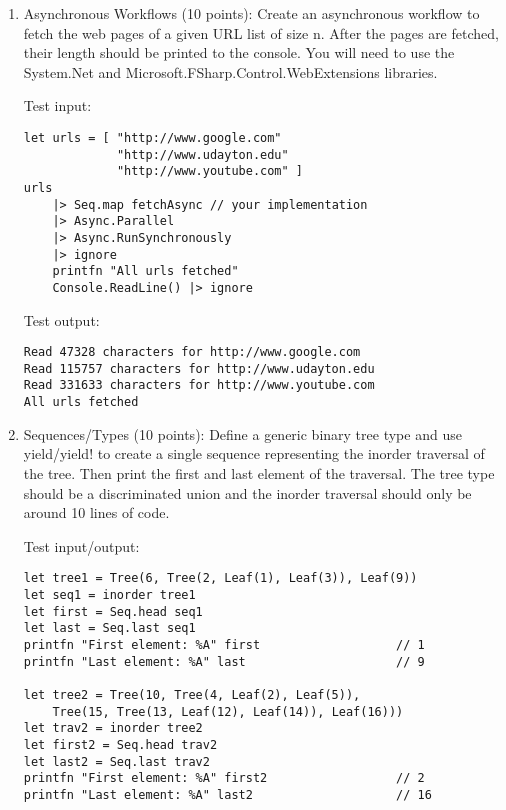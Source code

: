 \documentclass{article}
\begin{document}
\begin{enumerate}



\item
Asynchronous Workflows (10 points): Create an asynchronous workflow to fetch the web pages of a given URL list of size n. After the pages are fetched, their length should be printed to the console. You will need to use the System.Net and Microsoft.FSharp.Control.WebExtensions libraries.

\noindent
Test input:

\begin{lstlisting}
let urls = [ "http://www.google.com"
             "http://www.udayton.edu"
             "http://www.youtube.com" ]
urls
    |> Seq.map fetchAsync // your implementation
    |> Async.Parallel
    |> Async.RunSynchronously
    |> ignore
    printfn "All urls fetched"
    Console.ReadLine() |> ignore
\end{lstlisting}

\noindent
Test output:

\begin{lstlisting}
Read 47328 characters for http://www.google.com
Read 115757 characters for http://www.udayton.edu
Read 331633 characters for http://www.youtube.com
All urls fetched
\end{lstlisting}

\item
Sequences/Types (10 points): Define a generic binary tree type and use yield/yield! to create a single sequence representing the inorder traversal of the tree. Then print the first and last element of the traversal. The tree type should be a discriminated union and the inorder traversal should only be around 10 lines of code.

\noindent
Test input/output:

\begin{lstlisting}
let tree1 = Tree(6, Tree(2, Leaf(1), Leaf(3)), Leaf(9))
let seq1 = inorder tree1
let first = Seq.head seq1
let last = Seq.last seq1
printfn "First element: %A" first                   // 1
printfn "Last element: %A" last                     // 9

let tree2 = Tree(10, Tree(4, Leaf(2), Leaf(5)), 
    Tree(15, Tree(13, Leaf(12), Leaf(14)), Leaf(16)))
let trav2 = inorder tree2
let first2 = Seq.head trav2
let last2 = Seq.last trav2
printfn "First element: %A" first2                  // 2
printfn "Last element: %A" last2                    // 16
\end{lstlisting}


\end{enumerate}
\end{document}
